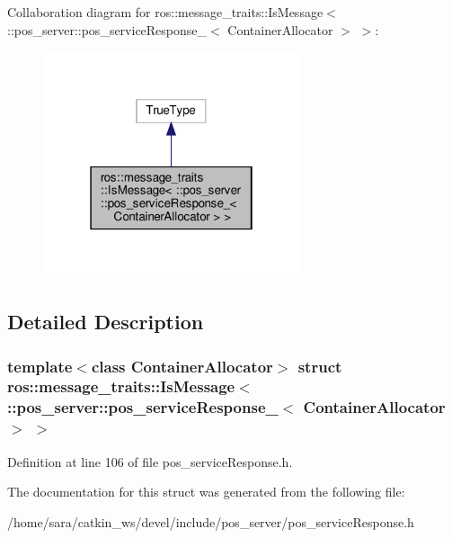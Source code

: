 Collaboration diagram for ros\+:\+:message\+\_\+traits\+:\+:Is\+Message$<$ \+:\+:pos\+\_\+server\+:\+:pos\+\_\+service\+Response\+\_\+$<$ Container\+Allocator $>$ $>$\+:
\nopagebreak
\begin{figure}[H]
\begin{center}
\leavevmode
\includegraphics[width=214pt]{structros_1_1message__traits_1_1IsMessage_3_01_1_1pos__server_1_1pos__serviceResponse___3_01Contd1f4b618552ff22989b3a1eaec33816b}
\end{center}
\end{figure}


\subsection{Detailed Description}
\subsubsection*{template$<$class Container\+Allocator$>$\newline
struct ros\+::message\+\_\+traits\+::\+Is\+Message$<$ \+::pos\+\_\+server\+::pos\+\_\+service\+Response\+\_\+$<$ Container\+Allocator $>$ $>$}



Definition at line 106 of file pos\+\_\+service\+Response.\+h.



The documentation for this struct was generated from the following file\+:\begin{DoxyCompactItemize}
\item 
/home/sara/catkin\+\_\+ws/devel/include/pos\+\_\+server/pos\+\_\+service\+Response.\+h\end{DoxyCompactItemize}
